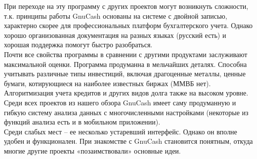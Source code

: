 При переходе на эту программу с других проектов могут возникнуть сложности, т.к. принципы работы GnuCash основаны на системе с двойной записью, характерно скорее для профессиональных платформ бухгалтерского учета. Однако хорошо организованная документация на разных языках (русский есть) и хорошая поддержка помогут быстро разобраться.\\

Почти все свойства программы в сравнении с другими продуктами заслуживают максимальной оценки. Программа продуманна в мельчайших деталях. Способна учитывать различные типы инвестиций, включая драгоценные металлы, ценные бумаги, котирующиеся на наиболее известных биржах (ММВБ нет). Алгоритмизация учета кредитов и других видов долга также на высоком уровне. Среди всех проектов из нашего обзора GnuCash имеет саму продуманную и гибкую систему анализа данных с многочисленными настройками (некоторые из функций анализа есть и в мобильном приложении).\\

Среди слабых мест – ее несколько устаревший интерфейс. Однако он вполне удобен и функционален. При знакомстве с GnuCash становится понятным, откуда многие другие проекты «позаимствовали» основные идеи.\\

